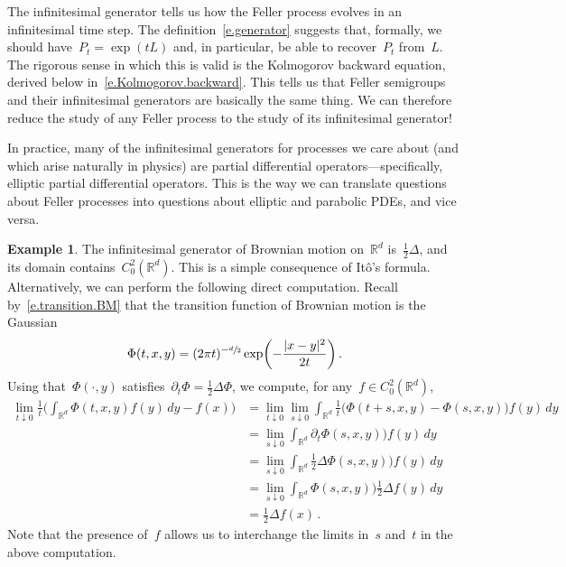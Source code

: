 \documentclass[11pt]{article} %
\numberwithin{equation}{section}
\theoremstyle{definition}
\newtheorem{example}[theorem]{Example}
\newcommand*{\Rd}{\ensuremath{\mathbb{R}^d}}
\begin{document}
The infinitesimal generator tells us how the Feller process evolves in an infinitesimal time step. The definition~\eqref{e.generator} suggests that, formally, we should have~$P_t = \exp(tL)$ and, in particular, be able to recover~$P_t$ from~$L$. The rigorous sense in which this is valid is the Kolmogorov backward equation, derived below in~\eqref{e.Kolmogorov.backward}. This tells us that Feller semigroups and their infinitesimal generators are basically the same thing. We can therefore reduce the study of any Feller process to the study of its infinitesimal generator!

\smallskip

In practice, many of the infinitesimal generators for processes we care about (and which arise naturally in physics) are partial differential operators---specifically, elliptic partial differential operators. This is the way we can translate questions about Feller processes into questions about elliptic and parabolic PDEs, and vice versa. 

\begin{example} 
The infinitesimal generator of Brownian motion on~$\Rd$ is~$\frac12\Delta$, and its domain contains~$C^2_0(\Rd)$. This is a simple consequence of It\^o's formula. 
Alternatively, we can perform the following direct computation. Recall by~\eqref{e.transition.BM} that the transition function of Brownian motion is the Gaussian
\begin{equation*}
\Phi(t,x,y) = (2\pi t)^{-\sfrac d2} \exp\biggl( -\frac{|x-y|^2}{2t} \biggr)\,.
\end{equation*}
Using that~$\Phi(\cdot,y)$ satisfies~$\partial_t \Phi = \frac12 \Delta \Phi$, 
we compute, for any~$f\in C^2_0(\Rd)$, 
\begin{align*}
\lim_{t\downarrow 0} 
\frac1t \biggl( \int_{\Rd} \Phi(t,x,y) f(y)\,dy - f(x)  \biggr) 
&
= 
\lim_{t\downarrow 0} 
\lim_{s \downarrow 0} 
\int_{\Rd} \frac1t \bigl(\Phi(t+s,x,y) - \Phi(s,x,y)\bigr) f(y) \,dy
\\ &
=
\lim_{s\downarrow 0} 
\int_{\Rd} \partial_t \Phi(s,x,y)\bigr) f(y) \,dy
\\ & 
=
\lim_{s\downarrow 0} 
\int_{\Rd} \frac12 \Delta \Phi(s,x,y)\bigr) f(y) \,dy
\\ & 
=
\lim_{s\downarrow 0} 
\int_{\Rd} \Phi(s,x,y)\bigr)  \frac12 \Delta f(y) \,dy
\\ & 
=
\frac12 \Delta f(x) 
\,.
\end{align*}
Note that the presence of~$f$ allows us to interchange the limits in~$s$ and~$t$ in the above computation. 
\end{example}
\end{document}
